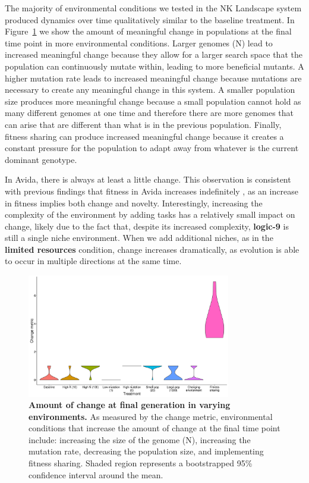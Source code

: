 \documentclass[letterpaper]{article}
\begin{document}
The majority of environmental conditions we tested in the NK Landscape system produced dynamics over time qualitatively similar to the baseline treatment. In Figure~\ref{change} we show the amount of meaningful change in populations at the final time point in more environmental conditions. Larger genomes (N) lead to increased meaningful change because they allow for a larger search space that the population can continuously mutate within, leading to more beneficial mutants. A higher mutation rate leads to increased meaningful change because mutations are necessary to create any meaningful change in this system. A smaller population size produces more meaningful change because a small population cannot hold as many different genomes at one time and therefore there are more genomes that can arise that are different than what is in the previous population. Finally, fitness sharing can produce increased meaningful change because it creates a constant pressure for the population to adapt away from whatever is the current dominant genotype.

In Avida, there is always at least a little change. This observation is consistent with previous findings that fitness in Avida increases indefinitely \citep{wiser_analysis_2015}, as an increase in fitness implies both change and novelty. Interestingly, increasing the complexity of the environment by adding tasks has a relatively small impact on change, likely due to the fact that, despite its increased complexity, \textbf{logic-9} is still a single niche environment. When we add additional niches, as in the \textbf{limited resources} condition, change increases dramatically, as evolution is able to occur in multiple directions at the same time.

\begin{figure}
\includegraphics[width=3.5in]{figs/changeboxplots.png}
\caption{\textbf{Amount of change at final generation in varying environments.} As measured by the change metric, environmental conditions that increase the amount of change at the final time point include: increasing the size of the genome (N), increasing the mutation rate, decreasing the population size, and implementing fitness sharing. Shaded region represents a bootstrapped 95\% confidence interval around the mean.}
\label{change}
\end{figure}
\end{document}
